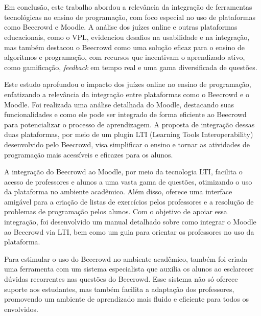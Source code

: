

\chapter{}

Em conclusão, este trabalho abordou a relevância da integração de ferramentas tecnológicas no ensino de programação, com foco especial no uso de plataformas como Beecrowd e Moodle. A análise dos juízes online e outras plataformas educacionais, como o VPL, evidenciou desafios na usabilidade e na integração, mas também destacou o Beecrowd como uma solução eficaz para o ensino de algoritmos e programação, com recursos que incentivam o aprendizado ativo, como gamificação, \textit{feedback} em tempo real e uma gama diversificada de questões.

Este estudo aprofundou o impacto dos juízes online no ensino de programação, enfatizando a relevância da integração entre plataformas como o Beecrowd e o Moodle. Foi realizada uma análise detalhada do Moodle, destacando suas funcionalidades e como ele pode ser integrado de forma eficiente ao Beecrowd para potencializar o processo de aprendizagem. A proposta de integração dessas duas plataformas, por meio de um plugin LTI (Learning Tools Interoperability) desenvolvido pelo Beecrowd, visa simplificar o ensino e tornar as atividades de programação mais acessíveis e eficazes para os alunos.

A integração do Beecrowd ao Moodle, por meio da tecnologia LTI, facilita o acesso de professores e alunos a uma vasta gama de questões, otimizando o uso da plataforma no ambiente acadêmico. Além disso, oferece uma interface amigável para a criação de listas de exercícios pelos professores e a resolução de problemas de programação pelos alunos. Com o objetivo de apoiar essa integração, foi desenvolvido um manual detalhado sobre como integrar o Moodle ao Beecrowd via LTI, bem como um guia para orientar os professores no uso da plataforma.

Para estimular o uso do Beecrowd no ambiente acadêmico, também foi criada uma ferramenta com um sistema especialista que auxilia os alunos ao esclarecer dúvidas recorrentes nas questões do Beecrowd. Esse sistema não só oferece suporte aos estudantes, mas também facilita a adaptação dos professores, promovendo um ambiente de aprendizado mais fluido e eficiente para todos os envolvidos.

